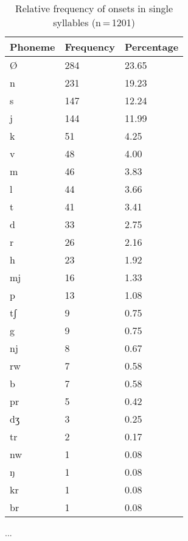 \begin{table}[hp]\centering
\caption[Relative frequency of onsets in single syllables]{Relative frequency of onsets in single syllables (n\,=\,1201)}
\begin{tabu} to 0.5\textwidth{X X[c] X[c]}
\tableheaderfont\toprule
Phoneme
	& Frequency
	& Percentage
	\\
	
\toprule

Ø	&	284	&	23.65\pct\\

\midrule

n	&	231	&	19.23\pct\\
s	&	147	&	12.24\pct\\
j	&	144	&	11.99\pct\\
k	&	51	&	4.25\pct\\
v	&	48	&	4.00\pct\\
m	&	46	&	3.83\pct\\
l	&	44	&	3.66\pct\\
t	&	41	&	3.41\pct\\
d	&	33	&	2.75\pct\\
r	&	26	&	2.16\pct\\
h	&	23	&	1.92\pct\\
mj	&	16	&	1.33\pct\\
p	&	13	&	1.08\pct\\
tʃ	&	9	&	0.75\pct\\
g	&	9	&	0.75\pct\\
nj	&	8	&	0.67\pct\\
rw	&	7	&	0.58\pct\\
b	&	7	&	0.58\pct\\
pr	&	5	&	0.42\pct\\
dʒ	&	3	&	0.25\pct\\
tr	&	2	&	0.17\pct\\
nw	&	1	&	0.08\pct\\
ŋ	&	1	&	0.08\pct\\
kr	&	1	&	0.08\pct\\
br	&	1	&	0.08\pct\\

\bottomrule
\end{tabu}
\label{tab:singon}
\end{table}

...

